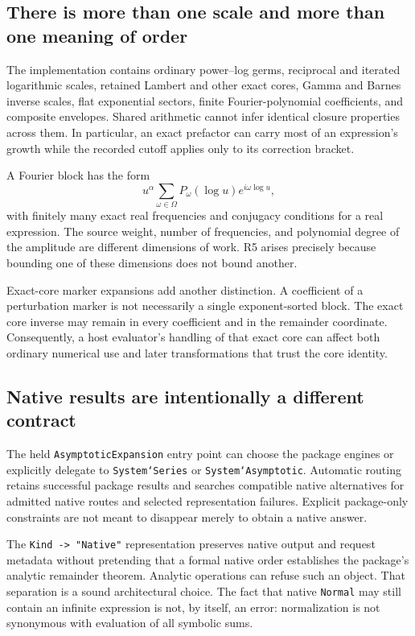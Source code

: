 \documentclass[11pt,a4paper]{article}
\newcommand{\code}[1]{\texttt{#1}}
\begin{document}
\subsection{There is more than one scale and more than one meaning of order}
The implementation contains ordinary power--log germs, reciprocal and iterated logarithmic scales, retained Lambert and other exact cores, Gamma and Barnes inverse scales, flat exponential sectors, finite Fourier-polynomial coefficients, and composite envelopes. Shared arithmetic cannot infer identical closure properties across them. In particular, an exact prefactor can carry most of an expression's growth while the recorded cutoff applies only to its correction bracket.\cite{repo,coreentry,kernelmap}

A Fourier block has the form
\begin{equation}
 u^\alpha\sum_{\omega\in\Omega}P_\omega(\log u)e^{i\omega\log u},
\end{equation}
with finitely many exact real frequencies and conjugacy conditions for a real expression. The source weight, number of frequencies, and polynomial degree of the amplitude are different dimensions of work. R5 arises precisely because bounding one of these dimensions does not bound another.\cite{fourier}

Exact-core marker expansions add another distinction. A coefficient of a perturbation marker is not necessarily a single exponent-sorted block. The exact core inverse may remain in every coefficient and in the remainder coordinate. Consequently, a host evaluator's handling of that exact core can affect both ordinary numerical use and later transformations that trust the core identity.\cite{coreperturb,sourcecoords}

\subsection{Native results are intentionally a different contract}
The held \code{AsymptoticExpansion} entry point can choose the package engines or explicitly delegate to \code{System`Series} or \code{System`Asymptotic}. Automatic routing retains successful package results and searches compatible native alternatives for admitted native routes and selected representation failures. Explicit package-only constraints are not meant to disappear merely to obtain a native answer.\cite{native}

The \code{Kind -> "Native"} representation preserves native output and request metadata without pretending that a formal native order establishes the package's analytic remainder theorem. Analytic operations can refuse such an object. That separation is a sound architectural choice. The fact that native \code{Normal} may still contain an infinite expression is not, by itself, an error: normalization is not synonymous with evaluation of all symbolic sums.\cite{native,repo}
\end{document}
